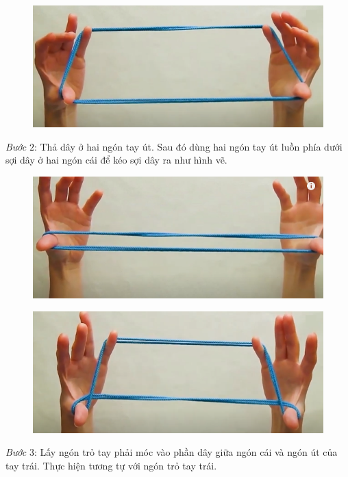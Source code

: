 \begin{multicols}{2}
\begin{figure}[H]
		\vspace*{1pt}
		\hspace*{1pt}\includegraphics[width=0.81\linewidth]{1c}
		\vspace*{-10pt}
	\end{figure}
	\textit{Bước} $2$: Thả dây ở hai ngón tay út. Sau đó dùng hai ngón tay út luồn phía dưới sợi dây ở hai ngón cái để kéo sợi dây ra như hình vẽ.
	\begin{figure}[H]
		\vspace*{-5pt}
		\centering
		\captionsetup{labelformat= empty, justification=centering}
		\includegraphics[width=0.81\linewidth]{2a}
	\end{figure}
	\begin{figure}[H]
		\vspace*{5pt}
		\centering
		\captionsetup{labelformat= empty, justification=centering}
		\includegraphics[width=0.81\linewidth]{2b}
		\vspace*{-10pt}
	\end{figure}
	\textit{Bước} $3$: Lấy ngón trỏ tay phải móc vào phần dây giữa ngón cái và ngón út của tay trái. Thực hiện tương tự với ngón trỏ tay trái.

\end{multicols}
